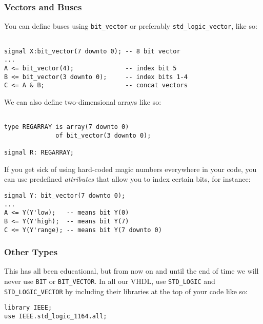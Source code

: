 \documentclass{IEEEtran}
\begin{document}
\subsubsection{Vectors and Buses}

You can define buses using \verb|bit_vector| or preferably \verb|std_logic_vector|, like so: 

\begin{Verbatim}[fontsize=\scriptsize, xleftmargin=.3in, commandchars=\\\{\}]

signal X:bit_vector(7 downto 0); -- 8 bit vector
...
A <= bit_vector(4);              -- index bit 5
B <= bit_vector(3 downto 0);     -- index bits 1-4
C <= A & B;                      -- concat vectors
\end{Verbatim}

We can also define two-dimensional arrays like so:

\begin{Verbatim}[fontsize=\scriptsize, xleftmargin=.3in, commandchars=\\\{\}]

type REGARRAY is array(7 downto 0) 
              of bit_vector(3 downto 0);
              
signal R: REGARRAY;
\end{Verbatim}

If you get sick of using hard-coded magic numbers everywhere in your code, you can use predefined \textit{attributes} that allow you to index certain bits, for instance:

\begin{Verbatim}[fontsize=\scriptsize, xleftmargin=.3in, commandchars=\\\{\}]
signal Y: bit_vector(7 downto 0);
...
A <= Y(Y'low);   -- means bit Y(0)
B <= Y(Y'high);  -- means bit Y(7)
C <= Y(Y'range); -- means bit Y(7 downto 0)

\end{Verbatim}

\subsubsection{Other Types}

This has all been educational, but from now on and until the end of time we will never use \verb|BIT| or \verb|BIT_VECTOR|. In all our VHDL, use \verb|STD_LOGIC| and \verb|STD_LOGIC_VECTOR| by including their libraries at the top of your code like so:
\begin{Verbatim}[fontsize=\scriptsize, xleftmargin=.3in, commandchars=\\\{\}]
library IEEE;
use IEEE.std_logic_1164.all;
\end{Verbatim}
\end{document}
